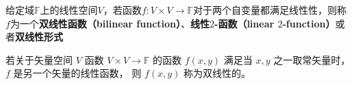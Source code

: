 


给定域$\mathbb{F}$上的线性空间$V$，若函数$f:V\times V\to \mathbb{F}$对于两个自变量都满足线性性，则称$f$为一个\textbf{双线性函数（bilinear function）}、\textbf{线性$2$-函数（linear $2$-function）}或者\textbf{双线性形式}


若关于矢量空间 $V$ 函数 $V\times V \to \mathbb F$ 的函数 $f(x,y)$ 满足当 $x,y$ 之一取常矢量时， $f$ 是另一个矢量的线性函数， 则 $f(x, y)$ 称为双线性的。

















